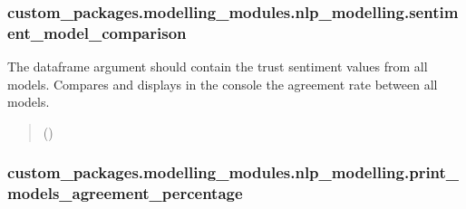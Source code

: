 \documentclass[letterpaper,10pt,english]{sphinxhowto}
\begin{document}
\sphinxstepscope


\subsubsection{custom\_packages.modelling\_modules.nlp\_modelling.sentiment\_model\_comparison}
\label{\detokenize{_autosummary/custom_packages.modelling_modules.nlp_modelling.sentiment_model_comparison:custom-packages-modelling-modules-nlp-modelling-sentiment-model-comparison}}\label{\detokenize{_autosummary/custom_packages.modelling_modules.nlp_modelling.sentiment_model_comparison::doc}}

\begin{fulllineitems}
\label{\detokenize{_autosummary/custom_packages.modelling_modules.nlp_modelling.sentiment_model_comparison:custom_packages.modelling_modules.nlp_modelling.sentiment_model_comparison}}
\pysigstartsignatures
\pysiglinewithargsret
{}
{}
{}
\pysigstopsignatures
\sphinxAtStartPar
The dataframe argument should contain the trust sentiment values from all models.
Compares and displays in the console the agreement rate between all models.
\begin{quote}\begin{description}
\sphinxAtStartPar
{} ()

\sphinxAtStartPar
{}

\end{description}\end{quote}

\end{fulllineitems}


\sphinxstepscope


\subsubsection{custom\_packages.modelling\_modules.nlp\_modelling.print\_models\_agreement\_percentage}
\label{\detokenize{_autosummary/custom_packages.modelling_modules.nlp_modelling.print_models_agreement_percentage:custom-packages-modelling-modules-nlp-modelling-print-models-agreement-percentage}}\label{\detokenize{_autosummary/custom_packages.modelling_modules.nlp_modelling.print_models_agreement_percentage::doc}}
\end{document}
